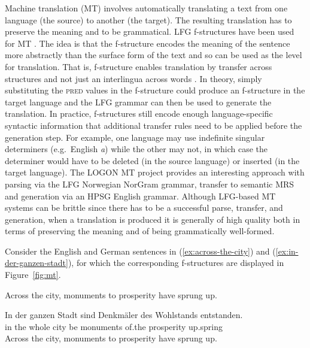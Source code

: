 \documentclass[output=paper,hidelinks]{langscibook}
\begin{document}
Machine translation (MT) involves automatically translating a text from one language (the source) to another (the target). The resulting translation has to preserve the meaning and to be grammatical. LFG f-structures have been used for MT \citep{Oep:Dyv:Lon:04,riezler-maxwell-iii-2006-grammatical,avramidiskuhn09,grahametal09,graham12,grahamvangenabith12,homolacoler12}. The idea  is that the f-structure encodes the meaning of the sentence more abstractly than the surface form of the text and so can be used as the level for translation. That is, f-structure enables translation by transfer across structures and not just an interlingua across words \citep{kaplanetal1989}. In theory, simply substituting the \textsc{pred} values in the f-structure could produce an f-structure in the target language and the LFG grammar can then be used to generate the translation. In practice, f-structures still encode enough language-specific syntactic information that additional transfer rules need to be applied before the generation step. For example, one language may use indefinite singular determiners (e.g.\ English {\em a}) while the other may not, in which case the determiner would have to be deleted (in the source language) or inserted (in the target language). The LOGON MT project \citep{Oep:Dyv:Lon:04} provides an interesting approach with parsing via the LFG Norwegian NorGram grammar, transfer to semantic MRS \citep{copestakeetal05} and generation via an HPSG English grammar.
Although LFG-based MT systems can be brittle since there has to be a successful parse, transfer, and generation, when a translation is produced it is generally of high quality both in terms of preserving the meaning and of being grammatically well-formed.

Consider the English and German sentences in (\ref{ex:across-the-city}) and (\ref{ex:in-der-ganzen-stadt}), for which the corresponding f-structures are displayed in Figure~\ref{fig:mt}.

\ea
   \label{ex:across-the-city} Across the city, monuments to prosperity have sprung up.
    \z

\ea
 \label{ex:in-der-ganzen-stadt}
 \gll   In der ganzen Stadt sind Denkm{\"a}ler des Wohlstands entstanden.\\
 in the whole city be monuments of.the prosperity up.spring\\
 \glt Across the city, monuments to prosperity have sprung up.
\z
\end{document}
